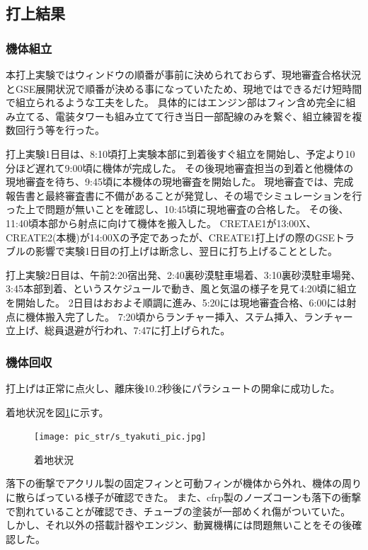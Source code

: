 \documentclass[a4paper,11pt,titlepage,uplatex]{jsarticle}
\begin{document}

\subsection{打上結果}
\subsubsection{機体組立}
本打上実験ではウィンドウの順番が事前に決められておらず、現地審査合格状況とGSE展開状況で順番が決める事になっていたため、現地ではできるだけ短時間で組立られるような工夫をした。
具体的にはエンジン部はフィン含め完全に組み立てる、電装タワーも組み立てて行き当日一部配線のみを繋ぐ、組立練習を複数回行う等を行った。

打上実験1日目は、8:10頃打上実験本部に到着後すぐ組立を開始し、予定より10分ほど遅れて9:00頃に機体が完成した。
その後現地審査担当の到着と他機体の現地審査を待ち、9:45頃に本機体の現地審査を開始した。
現地審査では、完成報告書と最終審査書に不備があることが発覚し、その場でシミュレーションを行った上で問題が無いことを確認し、10:45頃に現地審査の合格した。
その後、11:40頃本部から射点に向けて機体を搬入した。
CRETAE1が13:00X、CREATE2(本機)が14:00Xの予定であったが、CREATE1打上げの際のGSEトラブルの影響で実験1日目の打上げは断念し、翌日に打ち上げることとした。

打上実験2日目は、午前2:20宿出発、2:40裏砂漠駐車場着、3:10裏砂漠駐車場発、3:45本部到着、というスケジュールで動き、風と気温の様子を見て4:20頃に組立を開始した。
2日目はおおよそ順調に進み、5:20には現地審査合格、6:00には射点に機体搬入完了した。
7:20頃からランチャー挿入、ステム挿入、ランチャー立上げ、総員退避が行われ、7:47に打上げられた。


\subsubsection{機体回収}
打上げは正常に点火し、離床後10.2秒後にパラシュートの開傘に成功した。

着地状況を図\ref{s_tyakuti_pic}に示す。
\begin{figure}[H]
    \centering
    \texttt{[image: pic\_str/s\_tyakuti\_pic.jpg]}
    \caption{着地状況}
    \label{s_tyakuti_pic}
\end{figure}

落下の衝撃でアクリル製の固定フィンと可動フィンが機体から外れ、機体の周りに散らばっている様子が確認できた。
また、cfrp製のノーズコーンも落下の衝撃で割れていることが確認でき、チューブの塗装が一部めくれ傷がついていた。
しかし、それ以外の搭載計器やエンジン、動翼機構には問題無いことをその後確認した。
\end{document}
